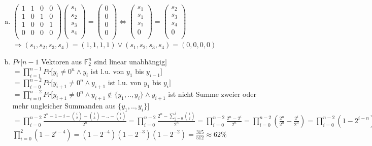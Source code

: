 \documentclass[a4paper]{scrartcl}
\begin{document}
\begin{enumerate}[a)]
\item

$ \begin{pmatrix}
1 & 1 & 0 & 0 \\
1 & 0 & 1 & 0 \\
1 & 0 & 0 & 1 \\
0 & 0 & 0 & 0 \\
\end{pmatrix} \begin{pmatrix}
s_1 \\
s_2 \\
s_3 \\
s_4 \\
\end{pmatrix} = \begin{pmatrix}
0 \\
0 \\
0 \\
0 \\
\end{pmatrix} \Leftrightarrow \begin{pmatrix}
s_1 \\
s_1 \\
s_1 \\
0 \\
\end{pmatrix} = \begin{pmatrix}
s_2 \\
s_3 \\
s_4 \\
0 \\
\end{pmatrix}$ \\
$\Rightarrow (s_1, s_2, s_3, s_4) = (1, 1, 1, 1) \vee (s_1, s_2, s_3, s_4) = (0, 0, 0, 0)$
\item $Pr[n-1$ Vektoren aus $\mathbb{F}_2^n$ sind linear unabhängig$] $\\
$=\prod_{i=1}^{n-1} Pr[y_{i}\neq 0^n \wedge y_{i}$ ist l.u. von $y_1$ bis $y_{i-1}]$\\
$=\prod_{i=0}^{n-2} Pr[y_{i+1}\neq 0^n \wedge y_{i+1}$ ist l.u. von $y_1$ bis $y_i]$\\
$=\prod_{i=0}^{n-2} Pr[y_{i+1}\neq 0^n \wedge y_{i+1} \notin \{y_1,..,y_i\} \wedge y_{i+1}$ ist nicht Summe zweier oder mehr ungleicher Summanden aus $\{y_1,..,y_i\}]$\\
$=\prod_{i=0}^{n-2} \frac{2^n-1-i-{i \choose 2}-{i \choose 3}-..-{i \choose i}}{2^n} =\prod_{i=0}^{n-2} \frac{2^n - \sum_{j=0}^i{i \choose j}}{2^n} = \prod_{i=0}^{n-2} \frac{2^n - 2^i}{2^n}= \prod_{i=0}^{n-2} (\frac{2^n}{2^n}-\frac{2^i}{2^n})= \prod_{i=0}^{n-2} (1-2^{i-n})$\\

$\prod_{i=0}^{2}(1-2^{i-4}) = (1-2^{-4})(1-2^{-3})(1-2^{-2})=\frac{315}{512}\approx 62 \%$
\end{enumerate}
\end{document}
